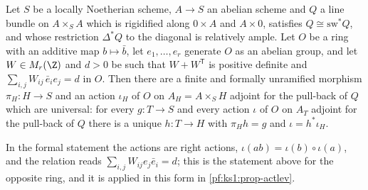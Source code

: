 \begin{theorem}\label{pf:ks1:thm-actrep}
Let $S$ be a locally Noetherian scheme, $A\to S$ an abelian scheme and $Q$ a line bundle on $A\times_SA$ which is rigidified along
$0\times A$ and $A\times0$, satisfies $Q\cong\mathrm{sw}^*Q$, and whose restriction $\Delta^*Q$ to the diagonal is relatively ample. Let $O$
be a ring with an additive map $b\mapsto\bar b$, let $e_1,\dots,e_r$ generate $O$ as an abelian group, and let $W\in M_r(\Z)$ and $d>0$ be
such that $W+W^{\mathsf T}$ is positive definite and $\sum_{i,j}W_{ij}\,\bar e_ie_j=d$ in $O$. Then there are a finite and formally unramified
morphism $\pi_H:H\to S$ and an action $\iota_H$ of $O$ on $A_H=A\times_SH$ adjoint for the pull-back of $Q$ which are universal: for every
$g:T\to S$ and every action $\iota$ of $O$ on $A_T$ adjoint for the pull-back of $Q$ there is a unique $h:T\to H$ with $\pi_Hh=g$ and
$\iota=h^*\iota_H$.
\end{theorem}

In the formal statement the actions are right actions, $\iota(ab)=\iota(b)\circ\iota(a)$, and the relation reads $\sum_{i,j}W_{ij}e_j\bar e_i=d$;
this is the statement above for the opposite ring, and it is applied in this form in \cref{pf:ks1:prop-actlev}.

